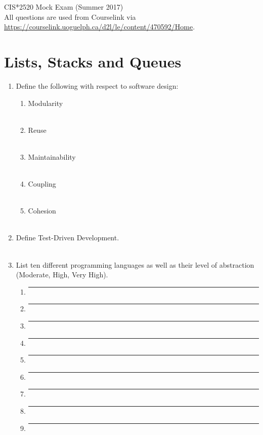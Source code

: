 \documentclass{article}
\begin{document}
\begin{center}
	{\Large CIS*2520 Mock Exam (Summer 2017)} \\
	\smallskip
	All questions are used from Courselink via \url{https://courselink.uoguelph.ca/d2l/le/content/470592/Home}.
\end{center}

\medskip
\section{Lists, Stacks and Queues}

\begin{enumerate}
	\item Define the following with respect to software design:
		\begin{enumerate}[label=\alph*.]
			\item Modularity \\\\
			\item Reuse \\\\
			\item Maintainability \\\\
			\item Coupling \\\\
			\item Cohesion \\\\
		\end{enumerate}
	\item Define Test-Driven Development. \\\\
	\item List ten different programming languages as well as their level of abstraction (Moderate, High, Very High).
		\begin{enumerate}[label=\arabic*.]
			\item \rule{8cm}{0.1mm}
			\item \rule{8cm}{0.1mm}
			\item \rule{8cm}{0.1mm}
			\item \rule{8cm}{0.1mm}
			\item \rule{8cm}{0.1mm}
			\item \rule{8cm}{0.1mm}
			\item \rule{8cm}{0.1mm}
			\item \rule{8cm}{0.1mm}
			\item \rule{8cm}{0.1mm}

\end{enumerate}
\end{enumerate}
\end{document}
